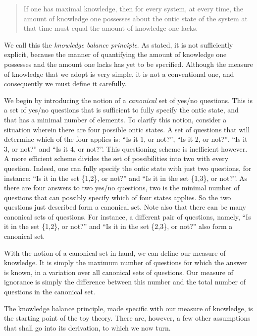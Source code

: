 \documentclass[pra,twocolumn,nofootinbib,showpacs]{revtex4}
\begin{document}
\begin{quotation}
If one has maximal knowledge, then for every system, at every time, the
amount of knowledge one possesses about the ontic state of the system at
that time must equal the amount of knowledge one lacks.
\end{quotation}

We call this the \emph{knowledge balance principle}. As stated, it is not
sufficiently explicit, because the manner of quantifying the amount of
knowledge one possesses and the amount one lacks has yet to be specified.
Although the measure of knowledge that we adopt is very simple, it is not a
conventional one, and consequently we must define it carefully.

We begin by introducing the notion of a \emph{canonical} set of yes/no
questions. This is a set of yes/no questions that is sufficient to fully
specify the ontic state, and that has a minimal number of elements. To
clarify this notion, consider a situation wherein there are four possible
ontic states. A set of questions that will determine which of the four
applies is: ``Is it 1, or not?'', ``Is it 2, or not?'', ``Is it 3, or not?''
and ``Is it 4, or not?''. This questioning scheme is inefficient however. A
more efficient scheme divides the set of possibilities into two with every
question. Indeed, one can fully specify the ontic state with just two
questions, for instance: ``Is it in the set \{1,2\}, or not?'' and ``Is it
in the set \{1,3\}, or not?''. As there are four answers to two yes/no
questions, two is the minimal number of questions that can possibly specify
which of four states applies. So the two questions just described form a
canonical set. Note also that there can be many canonical sets of questions.
For instance, a different pair of questions, namely, ``Is it in the set
\{1,2\}, or not?'' and ``Is it in the set \{2,3\}, or not?'' also form a
canonical set.

With the notion of a canonical set in hand, we can define our measure of
knowledge. It is simply the maximum number of questions for which the answer
is known, in a variation over all canonical sets of questions. Our measure
of ignorance is simply the difference between this number and the total
number of questions in the canonical set.

The knowledge balance principle, made specific with our measure of
knowledge, is the starting point of the toy theory. There are, however, a
few other assumptions that shall go into its derivation, to which we now
turn.
\end{document}
